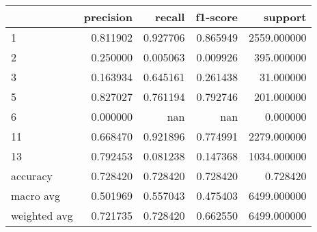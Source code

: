 \begin{tabular}{lrrrr}
\toprule
 & precision & recall & f1-score & support \\
\midrule
1 & 0.811902 & 0.927706 & 0.865949 & 2559.000000 \\
2 & 0.250000 & 0.005063 & 0.009926 & 395.000000 \\
3 & 0.163934 & 0.645161 & 0.261438 & 31.000000 \\
5 & 0.827027 & 0.761194 & 0.792746 & 201.000000 \\
6 & 0.000000 & nan & nan & 0.000000 \\
11 & 0.668470 & 0.921896 & 0.774991 & 2279.000000 \\
13 & 0.792453 & 0.081238 & 0.147368 & 1034.000000 \\
accuracy & 0.728420 & 0.728420 & 0.728420 & 0.728420 \\
macro avg & 0.501969 & 0.557043 & 0.475403 & 6499.000000 \\
weighted avg & 0.721735 & 0.728420 & 0.662550 & 6499.000000 \\
\bottomrule
\end{tabular}
